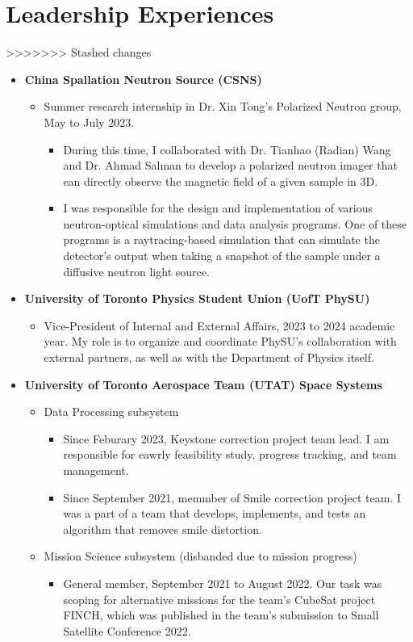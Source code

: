 \documentclass{article}
\newcommand{\cvsection}[1]{\section*{\rmfamily#1}}
\begin{document}
\cvsection{Leadership Experiences}
>>>>>>> Stashed changes
\begin{itemize}
    \item \textbf{China Spallation Neutron Source (CSNS)}
    \begin{itemize}
        \item Summer research internship in Dr. Xin Tong's Polarized Neutron group, May to July 2023. 
        \begin{itemize}
            \item During this time, I collaborated with Dr. Tianhao (Radian) Wang and Dr. Ahmad Salman to develop a polarized neutron imager that can directly observe the magnetic field of a given sample in 3D.
            \item I was responsible for the design and implementation of various neutron-optical simulations and data analysis programs. One of these programs is a raytracing-based simulation that can simulate the detector's output when taking a snapshot of the sample under a diffusive neutron light source.
        \end{itemize}
    \end{itemize}
    \item \textbf{University of Toronto Physics Student Union (UofT PhySU)}
    \begin{itemize}
        \item Vice-President of Internal and External Affairs, 2023 to 2024 academic year. My role is to organize and coordinate PhySU's collaboration with external partners, as well as with the Department of Physics itself. 
    \end{itemize}
    \item \textbf{University of Toronto Aerospace Team (UTAT) Space Systems}
    \begin{itemize}
        \item Data Processing subsystem
        \begin{itemize}
            \item Since Feburary 2023, Keystone correction project team lead. I am responsible for eawrly feasibility study, progress tracking, and team management.
            \item Since September 2021, memmber of Smile correction project team. I was a part of a team that develops, implements, and tests an algorithm that removes smile distortion.
        \end{itemize}

        \item Mission Science subsystem (disbanded due to mission progress)
        \begin{itemize}
            \item General member, September 2021 to August 2022. Our task was scoping for alternative missions for the team's CubeSat project FINCH, which was published in the team's submission to Small Satellite Conference 2022.
        \end{itemize} 
    \end{itemize}


\end{itemize}
\end{document}
